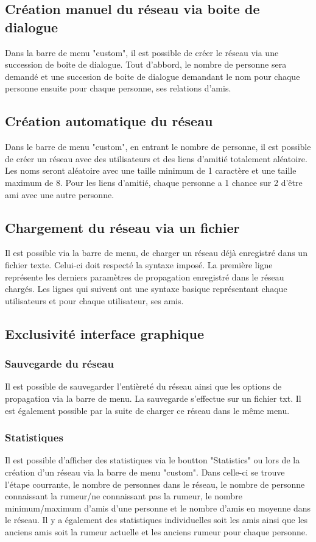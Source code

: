 \documentclass[a4paper,11pt]{article}
\begin{document}
{\subsection {Création manuel du réseau via boite de dialogue}
{Dans la barre de menu "custom", il est possible de créer le réseau via une succession de boite de dialogue.
Tout d'abbord, le nombre de personne sera demandé et une succesion de boite de dialogue demandant le nom pour chaque personne 
ensuite pour chaque personne, ses relations d'amis.}
\subsection {Création automatique du réseau}
{Dans le barre de menu "custom", en entrant le nombre de personne, il est possible de créer un réseau avec des utilisateurs et des liens d'amitié 
totalement aléatoire. Les noms seront aléatoire avec une taille minimum de 1 caractère et une taille maximum de 8. Pour les liens d'amitié, 
chaque personne a 1 chance sur 2 d'être ami avec une autre personne.}
\subsection {Chargement du réseau via un fichier}
{Il est possible via la barre de menu, de charger un réseau déjà enregistré dans un fichier texte. Celui-ci doit respecté la syntaxe imposé.
La première ligne représente les derniers paramètres de propagation enregistré dans le réseau chargés.
Les lignes qui suivent ont une syntaxe basique représentant chaque utilisateurs et pour chaque utilisateur, ses amis.}

\subsection {Exclusivité interface graphique}
\subsubsection {Sauvegarde du réseau}
{Il est possible de sauvegarder l'entièreté du réseau ainsi que les options de propagation via la barre de menu. La sauvegarde s'effectue sur un fichier txt.
Il est également possible par la suite de charger ce réseau dans le même menu.}
\subsubsection {Statistiques}
{Il est possible d'afficher des statistiques via le boutton "Statistics" ou lors de la création d'un réseau via la barre de menu "custom".
Dans celle-ci se trouve l'étape courrante, le nombre de personnes dans le réseau, le nombre de personne connaissant la rumeur/ne connaissant pas la rumeur,
le nombre minimum/maximum d'amis d'une personne et le nombre d'amis en moyenne dans le réseau. Il y a également des statistiques individuelles soit 
les amis ainsi que les anciens amis soit la rumeur actuelle et les anciens rumeur pour chaque personne.}
}
\end{document}
